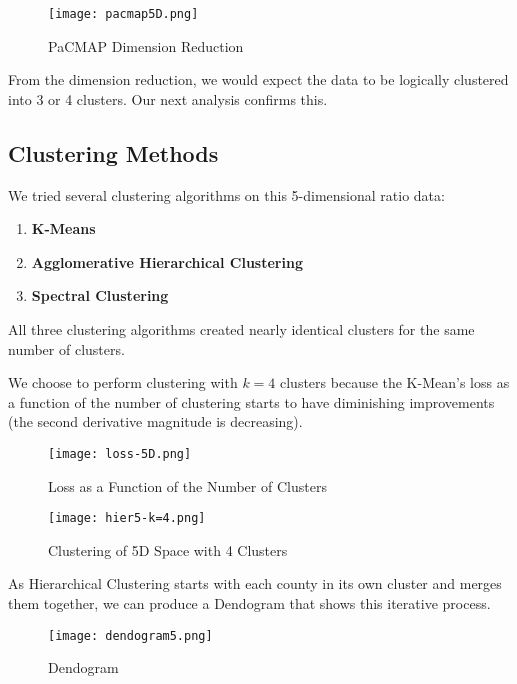 \documentclass[12pt]{article}
\begin{document}
\begin{figure}[H]
    \centering
    \texttt{[image: pacmap5D.png]}
    \caption{PaCMAP Dimension Reduction}
    \label{fig:enter-label}
\end{figure}

From the dimension reduction, we would expect the data to be logically clustered into 3 or 4 clusters. Our next analysis confirms this.


\subsection{Clustering Methods}
We tried several clustering algorithms on this 5-dimensional ratio data:
\begin{enumerate}
    \item \textbf{K-Means \cite{KMeansReference}}
    \item \textbf{Agglomerative Hierarchical Clustering \cite{HierarchicalReference}}
    \item \textbf{Spectral Clustering \cite{SpectralReference}}
\end{enumerate}
All three clustering algorithms created nearly identical clusters for the same number of clusters. 

We choose to perform clustering with $k=4$ clusters because the K-Mean's loss as a function of the number of clustering starts to have diminishing improvements (the second derivative magnitude is decreasing).

\begin{figure}[H]
    \centering
    \texttt{[image: loss-5D.png]}
    \caption{Loss as a Function of the Number of Clusters}
    \label{fig:enter-label}
\end{figure}

\begin{figure}[H]
    \centering
    \texttt{[image: hier5-k=4.png]}
    \caption{Clustering of 5D Space with 4 Clusters}
    \label{fig:enter-label}
\end{figure}

As Hierarchical Clustering starts with each county in its own cluster and merges them together, we can produce a Dendogram that shows this iterative process.

\begin{figure}[H]
    \centering
    \texttt{[image: dendogram5.png]}
    \caption{Dendogram}
    \label{fig:enter-label}
\end{figure}
\end{document}
